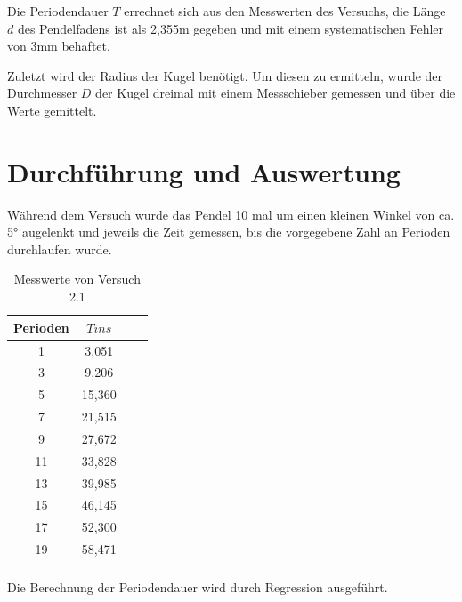Die Periodendauer $T$ errechnet sich aus den Messwerten des Versuchs, die Länge $d$ des Pendelfadens ist als 2,355m gegeben und mit einem systematischen Fehler von 3mm behaftet.

Zuletzt wird der Radius der Kugel benötigt. Um diesen zu ermitteln, wurde der Durchmesser $D$ der Kugel dreimal mit einem Messschieber gemessen und über die Werte gemittelt.

\section{Durchführung und Auswertung}

Während dem Versuch wurde das Pendel 10 mal um einen kleinen Winkel von ca. 5° augelenkt und jeweils die Zeit gemessen, bis die vorgegebene Zahl an Perioden durchlaufen wurde.

\begin{table}[h!]
    \begin{center}
        \caption{Messwerte von Versuch 2.1}
        \begin{tabular}{cccc}
            \hline
            Perioden  & $T in s$  \\
            \hline
            1                   & 3,051		\\
            3                   & 9,206		\\
            5                   & 15,360	\\
            7                   & 21,515	\\
            9                   & 27,672	\\
            11                  & 33,828	\\
            13                  & 39,985	\\
            15                  & 46,145	\\
	        17                  & 52,300	\\
	        19                  & 58,471	\\
            \hline
            \label{tab:2_1-werte}
        \end{tabular}
    \end{center}
\end{table}


Die Berechnung der Periodendauer wird durch Regression ausgeführt.

